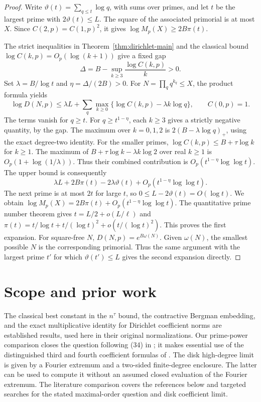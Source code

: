 \documentclass[11pt]{article}
\begin{document}
\begin{proof}
Write \(\vartheta(t)=\sum_{q\le t}\log q\), with sums over primes,
and let \(t\) be the largest prime with \(2\vartheta(t)\le L\).
The square of the associated primorial is at most \(X\).
Since \(C(2,p)=C(1,p)^2\), it gives
\(\log M_p(X)\ge2B\pi(t)\).

The strict inequalities in Theorem~\ref{thm:dirichlet-main}
and the classical bound \(\log C(k,p)=O_p(\log(k+1))\)
give a fixed gap
\[
 \Delta=B-\sup_{k\ge3}\frac{\log C(k,p)}{k}>0.
\]
Set \(\lambda=B/\log t\) and \(\eta=\Delta/(2B)>0\).
For \(N=\prod_q q^{k_q}\le X\), the product formula yields
\[
 \log D(N,p)\le \lambda L+
 \sum_{q}\max_{k\ge0}\{\log C(k,p)-\lambda k\log q\},
 \qquad C(0,p)=1.
\]
The terms vanish for \(q\ge t\). For \(q\ge t^{1-\eta}\), each
\(k\ge3\) gives a strictly negative quantity, by the gap.
The maximum over \(k=0,1,2\) is \(2(B-\lambda\log q)_+\),
using the exact degree-two identity. For the smaller primes,
\(\log C(k,p)\le B+\tau\log k\) for \(k\ge1\). The maximum of
\(B+\tau\log k-\lambda k\log2\) over real \(k\ge1\) is
\(O_p(1+\log(1/\lambda))\). Thus their combined contribution
is \(O_p(t^{1-\eta}\log\log t)\).
The upper bound is consequently
\[
 \lambda L+2B\pi(t)-2\lambda\vartheta(t)
             + O_p(t^{1-\eta}\log\log t).
\]
The next prime is at most \(2t\) for large \(t\), so
\(0\le L-2\vartheta(t)=O(\log t)\).
We obtain \(\log M_p(X)=2B\pi(t)+O_p(t^{1-\eta}\log\log t)\).
The quantitative prime number theorem gives
\(t=L/2+o(L/\ell)\) and
\(\pi(t)=t/\log t+t/(\log t)^2+o(t/(\log t)^2)\).
This proves the first expansion. For square-free \(N\),
\(D(N,p)=e^{B\omega(N)}\). Given \(\omega(N)\), the smallest
possible \(N\) is the corresponding primorial. Thus the
same argument with the largest prime \(t'\) for which
\(\vartheta(t')\le L\) gives the second expansion directly.
\end{proof}

\section{Scope and prior work}

The classical best constant in the \(n^\tau\) bound, the
contractive Bergman embedding, and the exact multiplicative
identity for Dirichlet coefficient norms are established
results, used here in their original normalizations. Our
prime-power comparison closes the question following (34) in
\cite{BBSS}; it makes essential use of the distinguished
third and fourth coefficient formulas of \cite{Low}.
The disk high-degree limit is given by a Fourier extremum
and a two-sided finite-degree enclosure. The latter can
be used to compute it without an assumed closed evaluation
of the Fourier extremum. The literature comparison covers
the references below and targeted searches for the stated
maximal-order question and disk coefficient limit.
\end{document}
